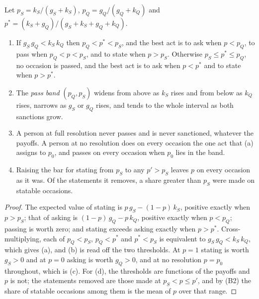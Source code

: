 \begin{proposition}\label{prop:passband}
Let $p_S = k_S/(g_S + k_S)$, $p_Q = g_Q/(g_Q + k_Q)$ and $p^{*} = (k_S + g_Q)/(g_S + k_S + g_Q + k_Q)$.
\begin{enumerate}[label=(\alph*)]
\item If $g_S\,g_Q < k_S\,k_Q$ then $p_Q < p^{*} < p_S$, and the best act is to ask when $p < p_Q$, to pass when $p_Q < p < p_S$, and to state when $p > p_S$. Otherwise $p_S \le p^{*} \le p_Q$, no occasion is passed, and the best act is to ask when $p < p^{*}$ and to state when $p > p^{*}$.
\item The \emph{pass band} $(p_Q, p_S)$ widens from above as $k_S$ rises and from below as $k_Q$ rises, narrows as $g_S$ or $g_Q$ rises, and tends to the whole interval as both sanctions grow.
\item A person at full resolution never passes and is never sanctioned, whatever the payoffs. A person at no resolution does on every occasion the one act that (a) assigns to $p_0$, and passes on every occasion when $p_0$ lies in the band.
\item Raising the bar for stating from $p_S$ to any $p' > p_S$ leaves $p$ on every occasion as it was. Of the statements it removes, a share greater than $p_S$ were made on statable occasions.
\end{enumerate}
\end{proposition}

\begin{proof}
The expected value of stating is $p\,g_S - (1-p)\,k_S$, positive exactly when $p > p_S$; that of asking is $(1-p)\,g_Q - p\,k_Q$, positive exactly when $p < p_Q$; passing is worth zero; and stating exceeds asking exactly when $p > p^{*}$. Cross-multiplying, each of $p_Q < p_S$, $p_Q < p^{*}$ and $p^{*} < p_S$ is equivalent to $g_S\,g_Q < k_S\,k_Q$, which gives (a), and (b) is read off the two thresholds. At $p = 1$ stating is worth $g_S > 0$ and at $p = 0$ asking is worth $g_Q > 0$, and at no resolution $p = p_0$ throughout, which is (c). For (d), the thresholds are functions of the payoffs and $p$ is not; the statements removed are those made at $p_S < p \le p'$, and by (B2) the share of statable occasions among them is the mean of $p$ over that range.
\end{proof}

